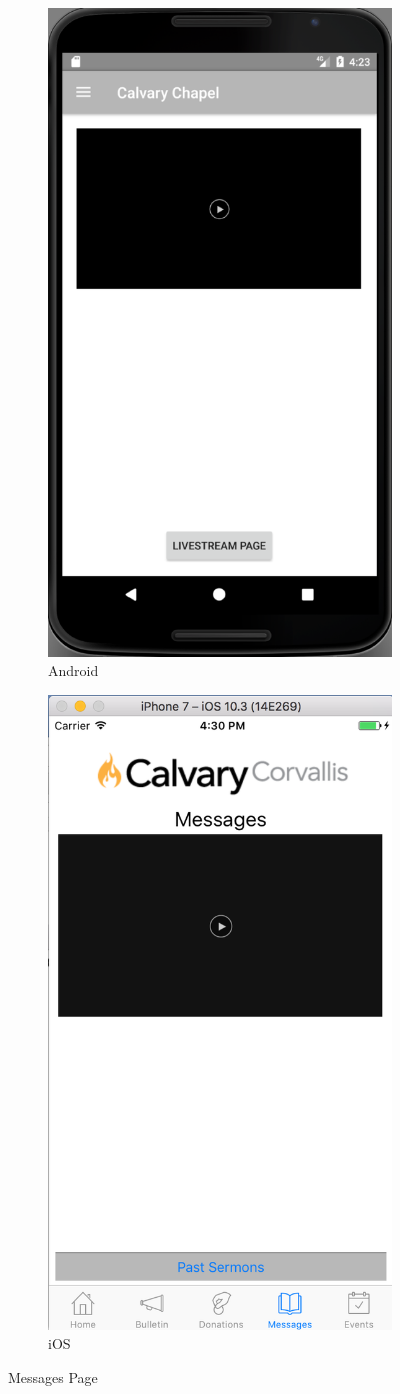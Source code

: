 \documentclass[letterpaper,10pt,draftclsnofoot,onecolumn,titlepage]{IEEEtran}
\begin{document}
	\begin{figure}[H]
			\centering
			\begin{subfigure}{.5\textwidth}
 				 \centering
  				 \includegraphics[width=.4\linewidth]{androidmessages}
 				 \caption{Android}
  				 \label{fig:sub1}
			\end{subfigure}%
			\begin{subfigure}{.5\textwidth}
		         	\centering
 				 \includegraphics[width=.4\linewidth]{iosmessages}
 				 \caption{iOS}
 				 \label{fig:sub2}
			\end{subfigure}
			\caption{Messages Page}
			\label{fig:message}
		\end{figure}
\end{document}
